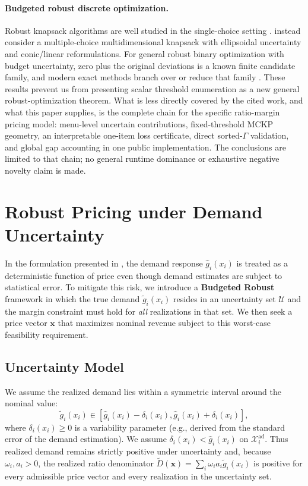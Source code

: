 \documentclass[11pt, a4paper]{article}
\theoremstyle{plain}
\theoremstyle{definition}
\theoremstyle{remark}
\begin{document}
\paragraph{Budgeted robust discrete optimization.}
Robust knapsack algorithms are well studied in the single-choice setting \citep{Monaci2013}.  \citet{Caserta2019} instead consider a
multiple-choice multidimensional knapsack with ellipsoidal uncertainty and conic/linear reformulations.  For general robust binary
optimization with budget uncertainty, zero plus the original deviations is a known finite candidate family, and modern exact methods branch
over or reduce that family \citep{Buesing2023}.  These results prevent us from presenting scalar threshold enumeration as a new general
robust-optimization theorem.  What is less directly covered by the cited work, and what this paper supplies, is the complete chain for the
specific ratio-margin pricing model: menu-level uncertain contributions, fixed-threshold MCKP geometry, an interpretable one-item loss
certificate, direct sorted-$\Gamma$ validation, and global gap accounting in one public implementation.  The conclusions are limited to
that chain; no general runtime dominance or exhaustive negative novelty claim is made.
\section{Robust Pricing under Demand Uncertainty}\label{sec:robust}

In the formulation presented in , the demand response $\hat{g}_i(x_i)$ is treated as a deterministic function of price even though demand estimates are subject to statistical error. To mitigate this risk, we introduce a \textbf{Budgeted Robust} framework in which the true demand $\tilde{g}_i(x_i)$ resides in an uncertainty set $\mathcal U$ and the margin constraint must hold for \textit{all} realizations in that set. We then seek a price vector $\bm{x}$ that maximizes nominal revenue subject to this worst-case feasibility requirement.

\subsection{Uncertainty Model}
We assume the realized demand lies within a symmetric interval around the nominal value:
\begin{equation}
    \tilde{g}_i(x_i) \in [\hat{g}_i(x_i) - \delta_i(x_i), \hat{g}_i(x_i) + \delta_i(x_i)],
\end{equation}
where $\delta_i(x_i) \ge 0$ is a variability parameter (e.g., derived from the standard error of the demand estimation). We assume $\delta_i(x_i)<\hat g_i(x_i)$ on $\mathcal X_i^{\mathrm{ad}}$. Thus realized demand remains strictly positive under uncertainty and, because $\omega_i,a_i>0$, the realized ratio denominator $\widetilde D(\bm x)=\sum_i\omega_i a_i\widetilde g_i(x_i)$ is positive for every admissible price vector and every realization in the uncertainty set.
\end{document}
